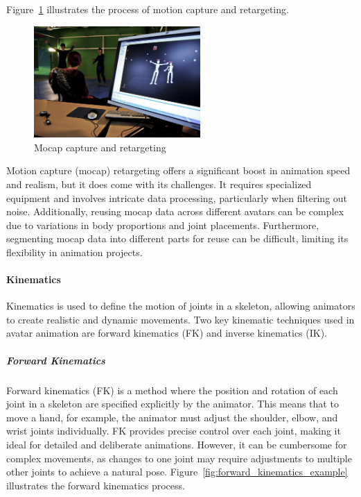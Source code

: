 \documentclass[../../main.tex]{subfiles}
\begin{document}
Figure~\ref{fig:mocap} illustrates the process of motion capture and retargeting.

\begin{figure} 
  \centering \includegraphics[width = 2.5in]{chapters/background_work/images/mocap.png} 
  \caption{Mocap capture and retargeting} 
  \label{fig:mocap} 
\end{figure}

Motion capture (mocap) retargeting offers a significant boost in animation speed and realism, but it does come with its challenges. It requires specialized equipment and involves intricate data processing, particularly when filtering out noise. Additionally, reusing mocap data across different avatars can be complex due to variations in body proportions and joint placements. Furthermore, segmenting mocap data into different parts for reuse can be difficult, limiting its flexibility in animation projects.

\paragraph{Kinematics}
\label{ch:background_work:sign_language_synthesis:3d_techniques:avatar_animation:kinematics}

Kinematics is used to define the motion of joints in a skeleton, allowing animators to create realistic and dynamic movements. Two key kinematic techniques used in avatar animation are forward kinematics (FK) and inverse kinematics (IK).

\subparagraph{Forward Kinematics}
\label{ch:background_work:sign_language_synthesis:3d_techniques:avatar_animation:kinematics:forward_kinematics}

Forward kinematics (FK) is a method where the position and rotation of each joint in a skeleton are specified explicitly by the animator. This means that to move a hand, for example, the animator must adjust the shoulder, elbow, and wrist joints individually. FK provides precise control over each joint, making it ideal for detailed and deliberate animations. However, it can be cumbersome for complex movements, as changes to one joint may require adjustments to multiple other joints to achieve a natural pose. Figure~\ref{fig:forward_kinematics_example} illustrates the forward kinematics process.
\end{document}

